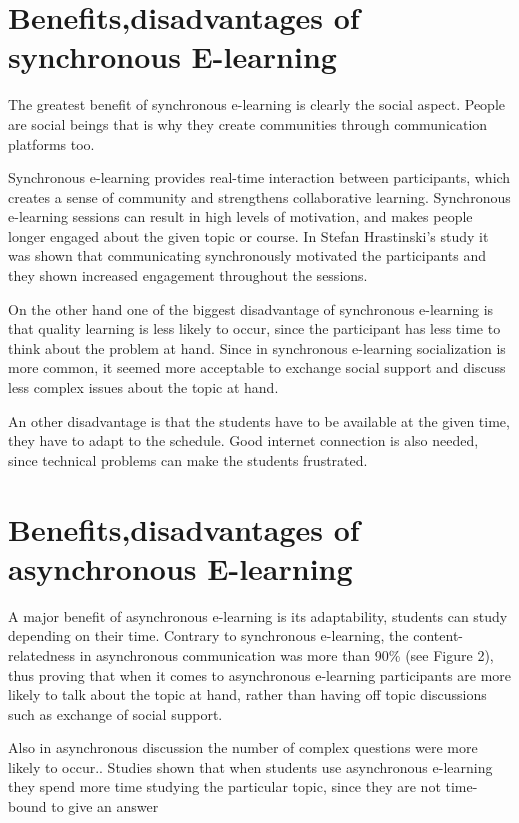 \documentclass[10pt,twoside,english,a4paper]{article}
\begin{document}
\section{Benefits,disadvantages of synchronous E-learning} \label{badose}
The greatest benefit of synchronous e-learning
is clearly the social aspect.
People are social beings that is why they create
communities through communication platforms too.

Synchronous e-learning provides real-time interaction
between participants, which creates a sense of community and strengthens collaborative learning. Synchronous e-learning sessions can result
in high levels of motivation, and makes people longer engaged about the given topic or course. In Stefan Hrastinski's study it was shown that
communicating synchronously motivated the participants 
and they shown increased engagement throughout the sessions\cite{Hrastinski:E-learning}.


On the other hand one of the biggest disadvantage 
of synchronous e-learning is that quality learning
is less likely to occur, since the participant has
less time to think about the problem at hand. Since in synchronous e-learning socialization is more common, it seemed more acceptable
to exchange social support and discuss less complex
issues about the topic at hand\cite{Hrastinski:E-learning}. 

An other disadvantage is that the students have to be 
available at the given time, they have to adapt
to the schedule. Good internet connection is also
needed, since technical problems can make the students frustrated. 


\section{Benefits,disadvantages of asynchronous E-learning} \label{badoae}
A major benefit of asynchronous e-learning is its adaptability, students can study depending on their time. Contrary to synchronous e-learning, the content-relatedness in asynchronous communication was more than 90\% (see Figure 2), thus proving that when it comes to asynchronous e-learning participants are more likely to talk about the topic at hand, rather than having off topic discussions such as exchange of social support.

Also in asynchronous discussion the number of complex questions were more likely to occur.\cite{Hrastinski:E-learning}.
Studies shown that when students use asynchronous e-learning they spend more time studying the particular topic, since they are not time-bound to give an answer
\end{document}
